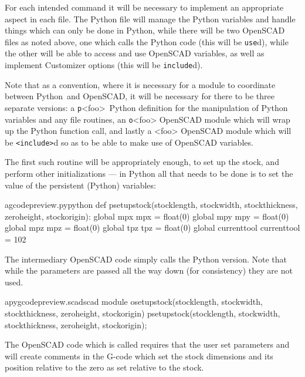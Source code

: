 \documentclass{ltxdoc}
\begin{document}
For each intended command it will be necessary to implement an appropriate aspect in each file. 
The Python file will manage the Python variables and handle things which can only be done in 
Python, while there will be two OpenSCAD files as noted above, one which calls the Python code 
(this will be \texttt{use}d), while the other will be able to access
and use OpenSCAD variables, as well as implement Customizer options
(this will be \texttt{include}d).

Note that as a convention, where it is necessary for a module to coordinate between 
Python~and OpenSCAD, it will be necessary for there to be three separate versions:
a \texttt{p}<foo>~Python definition for the manipulation of Python variables and
any file routines, an \texttt{o}<foo> OpenSCAD module which will wrap up the Python
function call, and lastly a <foo> OpenSCAD module which will be \texttt{<include>}d 
so as to be able to make use of OpenSCAD variables.

The first such routine will be appropriately enough, 
to set up the stock, and perform other initializations --- in Python all that needs 
to be done is to set the value of the persistent (Python) variables:

\lstset{firstnumber=\thegcpy}
\begin{writecode}{a}{gcodepreview.py}{python}
def psetupstock(stocklength, stockwidth, stockthickness, zeroheight, stockorigin):
    global mpx
    mpx = float(0)
    global mpy
    mpy = float(0)
    global mpz
    mpz = float(0)
    global tpz
    tpz = float(0)
    global currenttool
    currenttool = 102

\end{writecode}
\addtocounter{gcpy}{12}

The intermediary OpenSCAD code simply calls the Python version. 
Note that while the parameters are passed all the way down (for consistency) they are not
used.

\lstset{firstnumber=\thepyscad}
\begin{writecode}{a}{pygcodepreview.scad}{scad}
 module osetupstock(stocklength, stockwidth, stockthickness, zeroheight, stockorigin) {
     psetupstock(stocklength, stockwidth, stockthickness, zeroheight, stockorigin);
 }
 
\end{writecode}
\addtocounter{pyscad}{4}

The OpenSCAD code which is called requires that the user set 
parameters and will create comments in the G-code which set the stock dimensions and its 
position relative to the zero as set relative to the stock.
 
\end{document}
